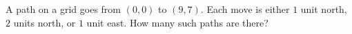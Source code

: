 A path on a grid goes from $(0,0)$ to $(9,7)$. Each move is either $1$ unit north, $2$ units north, or $1$ unit east. How many such paths are there?
